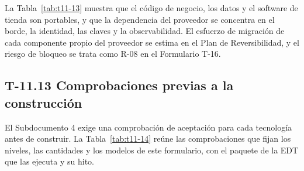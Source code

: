 \documentclass[11pt]{article}
\begin{document}
La Tabla~\mbox{\ref{tab:t11-13}} muestra que el código de negocio, los datos y el software de tienda son portables, y que la dependencia del proveedor se concentra en el borde, la identidad, las claves y la observabilidad. El esfuerzo de migración de cada componente propio del proveedor se estima en el Plan de Reversibilidad, y el riesgo de bloqueo se trata como R-08 en el Formulario T-16.

\subsection{T-11.13 Comprobaciones previas a la construcción}\label{t-11-13}

El Subdocumento 4 exige una comprobación de aceptación para cada tecnología antes de construir. La Tabla~\mbox{\ref{tab:t11-14}} reúne las comprobaciones que fijan los niveles, las cantidades y los modelos de este formulario, con el paquete de la EDT que las ejecuta y su hito.
\end{document}
